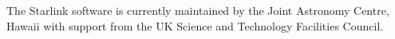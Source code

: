 \documentclass[final,authoryear,5p,times,twocolumn]{elsarticle}
\begin{document}
The Starlink software is currently maintained by the Joint Astronomy
Centre, Hawaii with support from the UK Science and Technology
Facilities Council.









\end{document}

